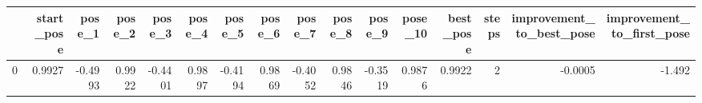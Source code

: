 \begin{tabular}{lrrrrrrrrrrrrrrr}
\toprule
{} &  start\_pose &  pose\_1 &  pose\_2 &  pose\_3 &  pose\_4 &  pose\_5 &  pose\_6 &  pose\_7 &  pose\_8 &  pose\_9 &  pose\_10 &  best\_pose &  steps &  improvement\_to\_best\_pose &  improvement\_to\_first\_pose \\
\midrule
0 &      0.9927 & -0.4993 &  0.9922 & -0.4401 &  0.9897 & -0.4194 &  0.9869 & -0.4052 &  0.9846 & -0.3519 &   0.9876 &     0.9922 &      2 &                   -0.0005 &                     -1.492 \\
\bottomrule
\end{tabular}

